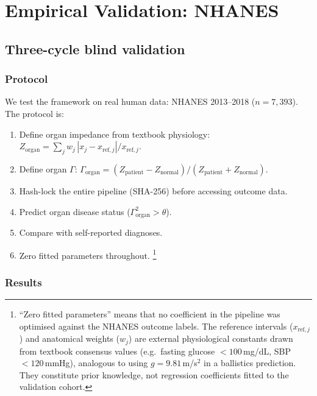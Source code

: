 \documentclass[aps,pre,twocolumn,superscriptaddress,floatfix]{revtex4-2}
\begin{document}
\section{Empirical Validation: NHANES}
\label{sec:nhanes}

\subsection{Three-cycle blind validation}
\label{sec:nhanes-3cycle}

\subsubsection{Protocol}

We test the framework on real human data:
NHANES 2013--2018 ($n = 7{,}393$).
The protocol is:
\begin{enumerate}
  \item Define organ impedance from textbook physiology:
    $Z_{\text{organ}} = \sum_j w_j\,|x_j - x_{\text{ref},j}|
    / x_{\text{ref},j}$.
  \item Define organ $\Gamma$:
    $\Gamma_{\text{organ}} = (Z_{\text{patient}} -
    Z_{\text{normal}}) / (Z_{\text{patient}} +
    Z_{\text{normal}})$.
  \item Hash-lock the entire pipeline (SHA-256) before
    accessing outcome data.
  \item Predict organ disease status
    ($\Gamma_{\text{organ}}^2 > \theta$).
  \item Compare with self-reported diagnoses.
  \item Zero fitted parameters throughout.%
    \footnote{``Zero fitted parameters'' means that no
    coefficient in the pipeline was optimised against
    the NHANES outcome labels.
    The reference intervals ($x_{\text{ref},j}$) and
    anatomical weights ($w_j$) are external physiological
    constants drawn from textbook consensus values
    (e.g.\ fasting glucose $<100$\,mg/dL,
    SBP $<120$\,mmHg), analogous to using
    $g = 9.81$\,m/s$^2$ in a ballistics prediction.
    They constitute prior knowledge, not regression
    coefficients fitted to the validation cohort.}
\end{enumerate}

\subsubsection{Results}
\end{document}
